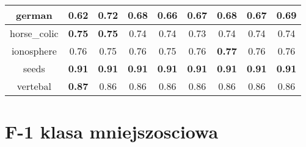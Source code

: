 \documentclass{article}%
\begin{document}
\begin{tabular}{c|cccccccc}
\hline%
german&0.62&\textbf{0.72}&0.68&0.66&0.67&0.68&0.67&0.69\\%
\hline%
horse\_colic&\textbf{0.75}&\textbf{0.75}&0.74&0.74&0.73&0.74&0.74&0.74\\%
\hline%
ionosphere&0.76&0.75&0.76&0.75&0.76&\textbf{0.77}&0.76&0.76\\%
\hline%
seeds&\textbf{0.91}&\textbf{0.91}&\textbf{0.91}&\textbf{0.91}&\textbf{0.91}&\textbf{0.91}&\textbf{0.91}&\textbf{0.91}\\%
\hline%
vertebal&\textbf{0.87}&0.86&0.86&0.86&0.86&0.86&0.86&0.86\\%
\hline%
\end{tabular}

%
\section*{F{-}1 klasa mniejszosciowa}%
\end{document}

